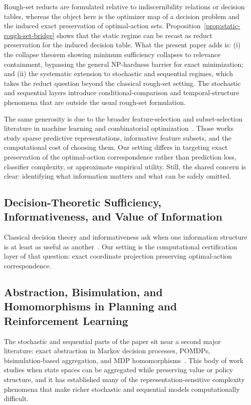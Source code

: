 Rough-set reducts are formulated relative to indiscernibility relations or decision tables, whereas the object here is the optimizer map of a decision problem and the induced exact preservation of optimal-action sets. Proposition~\ref{prop:static-rough-set-bridge} shows that the static regime can be recast as reduct preservation for the induced decision table. What the present paper adds is: (i) the collapse theorem showing minimum sufficiency collapses to relevance containment, bypassing the general NP-hardness barrier for exact minimization; and (ii) the systematic extension to stochastic and sequential regimes, which takes the reduct question beyond the classical rough-set setting. The stochastic and sequential layers introduce conditional-comparison and temporal-structure phenomena that are outside the usual rough-set formulation.

The same generosity is due to the broader feature-selection and subset-selection literature in machine learning and combinatorial optimization~\cite{blum1997selection,amaldi1998complexity}. Those works study sparse predictive representations, informative feature subsets, and the computational cost of choosing them. Our setting differs in targeting exact preservation of the optimal-action correspondence rather than prediction loss, classifier complexity, or approximate empirical utility. Still, the shared concern is clear: identifying what information matters and what can be safely omitted.

\subsection{Decision-Theoretic Sufficiency, Informativeness, and Value of Information}

Classical decision theory and informativeness ask when one information structure is at least as useful as another~\cite{blackwell1953equivalent,savage1954foundations,raiffa1961applied,howard1966information}. Our setting is the computational certification layer of that question: exact coordinate projection preserving optimal-action correspondence.

\subsection{Abstraction, Bisimulation, and Homomorphisms in Planning and Reinforcement Learning}

The stochastic and sequential parts of the paper sit near a second major literature: exact abstraction in Markov decision processes, POMDPs, bisimulation-based aggregation, and MDP homomorphisms~\cite{papadimitriou1987mdp,littman1998probplanning,mundhenk2000mdp,givan2003equivalence,ravindran2004algebraic}. This body of work studies when state spaces can be aggregated while preserving value or policy structure, and it has established many of the representation-sensitive complexity phenomena that make richer stochastic and sequential models computationally difficult.


